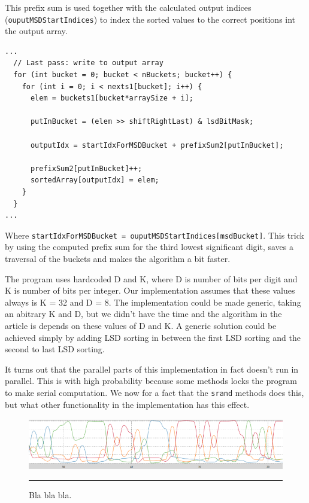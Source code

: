 This prefix sum is used together with the calculated output indices (\verb!ouputMSDStartIndices!) to index the sorted values to the correct positions int the output array.
\begin{lstlisting}
...
  // Last pass: write to output array
  for (int bucket = 0; bucket < nBuckets; bucket++) {
    for (int i = 0; i < nexts1[bucket]; i++) {
      elem = buckets1[bucket*arraySize + i];

      putInBucket = (elem >> shiftRightLast) & lsdBitMask;

      outputIdx = startIdxForMSDBucket + prefixSum2[putInBucket];

      prefixSum2[putInBucket]++;
      sortedArray[outputIdx] = elem;
    }
  }
... 
\end{lstlisting}
Where \verb!startIdxForMSDBucket = ouputMSDStartIndices[msdBucket]!.
This trick by using the computed prefix sum for the third lowest significant digit, saves a traversal of the buckets and makes the algorithm a bit faster.

The program uses hardcoded D and K, where D is number of bits per digit and K is number of bits per integer. Our implementation assumes that these values always is K = 32 and D = 8.
The implementation could be made generic, taking an abitrary K and D, but we didn't have the time and the algorithm in the article is depends on these values of D and K.
A generic solution could be achieved simply by adding LSD sorting in between the first LSD sorting and the second to last LSD sorting.

It turns out that the parallel parts of this implementation in fact doesn't run in parallel. This is with high probability because some methods locks the program to make serial computation.
We now for a fact that the \verb!srand! methods does this, but what other functionality in the implementation has this effect.   

\begin{figure}[htbp]
	\centering
		\includegraphics[width=\textwidth]{./Figures/Project2b/multicore_cpu_usage.png}
		\rule{35em}{0.5pt}
	\caption[Multicore CPU usage]{
	Bla bla bla.
	}
	\label{fig:multicore_cpu_usage}
\end{figure}

